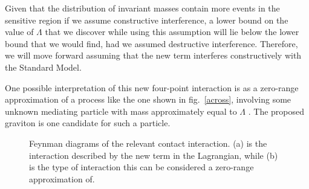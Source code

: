 Given that the distribution of invariant masses contain more events in the sensitive region if we assume constructive interference, a lower bound on the value of $\Lambda$ that we discover while using this assumption will lie below the lower bound that we would find, had we assumed destructive interference. Therefore, we will move forward assuming that the new term interferes constructively with the Standard Model.

One possible interpretation of this new four-point interaction is as a zero-range approximation of a process like the one shown in fig.~\ref{across}, involving some unknown mediating particle with mass approximately equal to $\Lambda$ \cite{marshaw}. The proposed graviton is one candidate for such a particle.

\begin{figure}[htb]
\parbox[t]{.45\textwidth}{\begin{center}\begin{footnotesize}
\end{footnotesize}\end{center}
}\hfill
\parbox[t]{.45\textwidth}{\begin{center}\begin{footnotesize}
\end{footnotesize}\end{center}
}\hfill
\caption{Feynman diagrams of the relevant contact interaction. (a) is the interaction described by the new term in the Lagrangian, while (b) is the type of interaction this can be considered a zero-range approximation of.\label{feyns}}
\end{figure}


